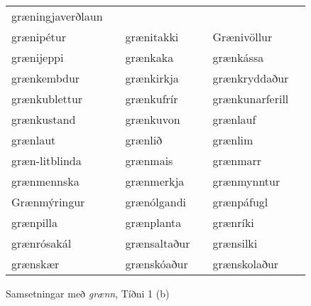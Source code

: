 \documentclass[../samsetningasafn.tex]{subfiles}
\begin{document}
\begin{wordlist}[H]
\begin{tcolorbox}
\begin{tabular}{BlBlBl}
		græningjaverðlaun& 	\\  %
		grænipétur	&		& 
		grænitakki	&		& 
		Grænivöllur	&		\\  %
		grænijeppi	&		& 
		grænkaka	&		& 
		grænkássa	&		\\  %
		grænkembdur	&	& 
		grænkirkja	&		& 
		grænkryddaður &		\\  %
		grænkublettur	&	& 
		grænkufrír	&		& 
		grænkunarferill	&	\\  %
		grænkustand	&		& 
		grænkuvon	&		& 
		grænlauf	&		\\  %
		grænlaut	&		& 
		grænlið		&		& 
		grænlim		&		\\  %
		græn-litblinda &		& 
		grænmais	&		& 
		grænmarr	&		\\  %
		grænmennska &		& 
		grænmerkja	&		& 
		grænmynntur &		\\  %
		Grænmýringur &		& 
		grænólgandi	&		& 
		grænpáfugl	&		\\  %
		grænpilla	&		& 
		grænplanta	&		& 
		grænríki		&		\\  %
		grænrósakál	&		& 
		grænsaltaður	&		& 
		grænsilki	&		\\  %
		grænskær	&		& 
		grænskóaður	&		& 
		grænskolaður &		  %
	\end{tabular}
	
\end{tcolorbox}
	\caption{Samsetningar með \textit{grænn}, Tíðni 1 (b)}
	\label{listi:graent.1b}
\end{wordlist}		
\end{document}
